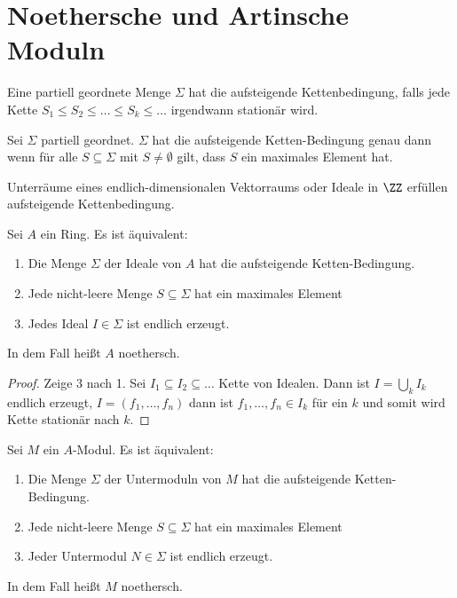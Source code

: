 \section{Noethersche und Artinsche Moduln}
\begin{Def}
	Eine partiell geordnete Menge \(\Sigma\) hat die aufsteigende Kettenbedingung, falls jede Kette \(S_1\leq S_2\leq\dots\leq S_k\leq\dots\) irgendwann stationär wird.
\end{Def}
\begin{Lemma}
	Sei \(\Sigma\) partiell geordnet. \(\Sigma\) hat die aufsteigende Ketten-Bedingung genau dann wenn für alle \(S\subseteq \Sigma\) mit \(S\neq \emptyset\) gilt, dass \(S\) ein maximales Element hat.
\end{Lemma}
\begin{Bsp}
	Unterräume eines endlich-dimensionalen Vektorraums oder Ideale in \(\ZZ\) erfüllen aufsteigende Kettenbedingung.
\end{Bsp}
\begin{Satz}
	Sei \(A\) ein Ring. Es ist äquivalent:
	\begin{enumerate}
		\item Die Menge \(\Sigma\) der Ideale von \(A\) hat die aufsteigende Ketten-Bedingung.
		\item Jede nicht-leere Menge \(S\subseteq \Sigma\) hat ein maximales Element
		\item Jedes Ideal \(I\in\Sigma\) ist endlich erzeugt.
	\end{enumerate}
	In dem Fall heißt \(A\) noethersch.
\end{Satz}
\begin{proof}
	Zeige 3 nach 1. Sei \(I_1\subseteq I_2\subseteq\dots\) Kette von Idealen. Dann ist \(I=\bigcup_kI_k\) endlich erzeugt, \(I=(f_1,\dots,f_n)\) dann ist \(f_1,\dots,f_n\in I_k\) für ein \(k\) und somit wird Kette stationär nach \(k\).
\end{proof}
\begin{Satz}
	Sei \(M\) ein \(A\)-Modul. Es ist äquivalent:
	\begin{enumerate}
		\item Die Menge \(\Sigma\) der Untermoduln von \(M\) hat die aufsteigende Ketten-Bedingung.
		\item Jede nicht-leere Menge \(S\subseteq \Sigma\) hat ein maximales Element
		\item Jeder Untermodul \(N\in\Sigma\) ist endlich erzeugt.
	\end{enumerate}
	In dem Fall heißt \(M\) noethersch.
\end{Satz}
